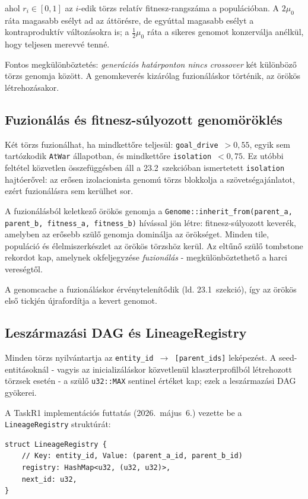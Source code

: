 ﻿\documentclass[a4paper,12pt]{report}
\begin{document}
ahol $r_i \in [0,1]$ az $i$-edik törzs relatív fitnesz-rangszáma a populációban.
A $2\mu_0$ ráta magasabb esélyt ad az áttörésre, de egyúttal magasabb esélyt
a kontraproduktív változásokra is; a $\tfrac{1}{2}\mu_0$ ráta a sikeres genomot
konzerválja anélkül, hogy teljesen merevvé tenné.

Fontos megkülönböztetés: \textit{generációs határponton nincs crossover}
két különböző törzs genomja között. A genomkeverés kizárólag fuzionáláskor
történik, az örökös létrehozásakor.

\subsection*{Fuzionálás és fitnesz-súlyozott genomöröklés}

Két törzs fuzionálhat, ha mindkettőre teljesül: \texttt{goal\_drive}~$> 0{,}55$,
egyik sem tartózkodik \texttt{AtWar} állapotban, és mindkettőre
\texttt{isolation}~$< 0{,}75$.
Ez utóbbi feltétel közvetlen összefüggésben áll a 23.2~szekcióban ismertetett
\texttt{isolation} hajtóerővel: az erősen izolacionista genomú törzs blokkolja
a szövetségajánlatot, ezért fuzionálásra sem kerülhet sor.

A fuzionálásból keletkező örökös genomja a \texttt{Genome::inherit\_from(parent\_a,
parent\_b, fitness\_a, fitness\_b)} hívással jön létre: fitnesz-súlyozott keverék,
amelyben az erősebb szülő genomja dominálja az örökséget.
Minden tile, populáció és élelmiszerkészlet az örökös törzshöz kerül.
Az eltűnő szülő tombstone rekordot kap, amelynek okfeljegyzése \textit{fuzionálás}
- megkülönböztethető a harci vereségtől.

A genomcache a fuzionáláskor érvénytelenítődik (ld. 23.1~szekció),
így az örökös első tickjén újrafordítja a kevert genomot.

\subsection*{Leszármazási DAG és LineageRegistry}

Minden törzs nyilvántartja az \texttt{entity\_id $\to$ [parent\_ids]} leképezést.
A seed-entitásoknál - vagyis az inicializáláskor közvetlenül klaszterprofilból
létrehozott törzsek esetén - a szülő \texttt{u32::MAX} sentinel értéket kap;
ezek a leszármazási DAG gyökerei.

A TaskR1 implementációs futtatás (2026.~május~6.) vezette be a \texttt{LineageRegistry}
struktúrát:

\begin{lstlisting}[language={}, caption={A LineageRegistry kompakt adatstruktúrája.},
  label={lst:lineage-registry}]
struct LineageRegistry {
    // Key: entity_id, Value: (parent_a_id, parent_b_id)
    registry: HashMap<u32, (u32, u32)>,
    next_id: u32,
}
\end{lstlisting}
\end{document}
